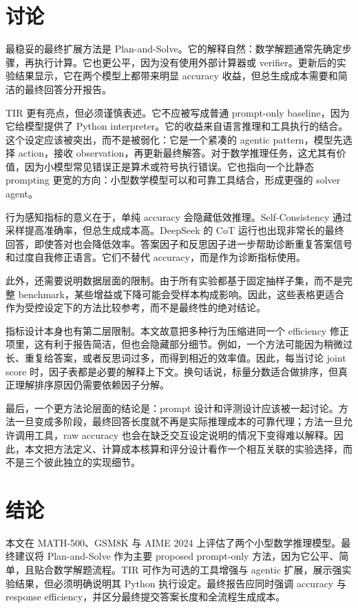 \documentclass[conference]{IEEEtran}
\newcommand{\mathfive}{MATH-500}
\begin{document}
\section{讨论}
最稳妥的最终扩展方法是 Plan-and-Solve。它的解释自然：数学解题通常先确定步骤，再执行计算。它也更公平，因为没有使用外部计算器或 verifier。更新后的实验结果显示，它在两个模型上都带来明显 accuracy 收益，但总生成成本需要和简洁的最终回答分开报告。

TIR 更有亮点，但必须谨慎表述。它不应被写成普通 prompt-only baseline，因为它给模型提供了 Python interpreter。它的收益来自语言推理和工具执行的结合。这个设定应该被突出，而不是被弱化：它是一个紧凑的 agentic pattern，模型先选择 action，接收 observation，再更新最终解答。对于数学推理任务，这尤其有价值，因为小模型常见错误正是算术或符号执行错误。它也指向一个比静态 prompting 更宽的方向：小型数学模型可以和可靠工具结合，形成更强的 solver agent。

行为感知指标的意义在于，单纯 accuracy 会隐藏低效推理。Self-Consistency 通过采样提高准确率，但总生成成本高。DeepSeek 的 CoT 运行也出现非常长的最终回答，即使答对也会降低效率。答案因子和反思因子进一步帮助诊断重复答案信号和过度自我修正语言。它们不替代 accuracy，而是作为诊断指标使用。

此外，还需要说明数据层面的限制。由于所有实验都基于固定抽样子集，而不是完整 benchmark，某些增益或下降可能会受样本构成影响。因此，这些表格更适合作为受控设定下的方法比较参考，而不是最终性的绝对结论。

指标设计本身也有第二层限制。本文故意把多种行为压缩进同一个 efficiency 修正项里，这有利于报告简洁，但也会隐藏部分细节。例如，一个方法可能因为稍微过长、重复给答案，或者反思词过多，而得到相近的效率值。因此，每当讨论 joint score 时，因子表都是必要的解释上下文。换句话说，标量分数适合做排序，但真正理解排序原因仍需要依赖因子分解。

最后，一个更方法论层面的结论是：prompt 设计和评测设计应该被一起讨论。方法一旦变成多阶段，最终回答长度就不再是实际推理成本的可靠代理；方法一旦允许调用工具，raw accuracy 也会在缺乏交互设定说明的情况下变得难以解释。因此，本文把方法定义、计算成本核算和评分设计看作一个相互关联的实验选择，而不是三个彼此独立的实现细节。

\section{结论}
本文在 \mathfive{}、GSM8K 与 AIME 2024 上评估了两个小型数学推理模型。最终建议将 Plan-and-Solve 作为主要 proposed prompt-only 方法，因为它公平、简单，且贴合数学解题流程。TIR 可作为可选的工具增强与 agentic 扩展，展示强实验结果，但必须明确说明其 Python 执行设定。最终报告应同时强调 accuracy 与 response efficiency，并区分最终提交答案长度和全流程生成成本。

\FloatBarrier


\end{document}
